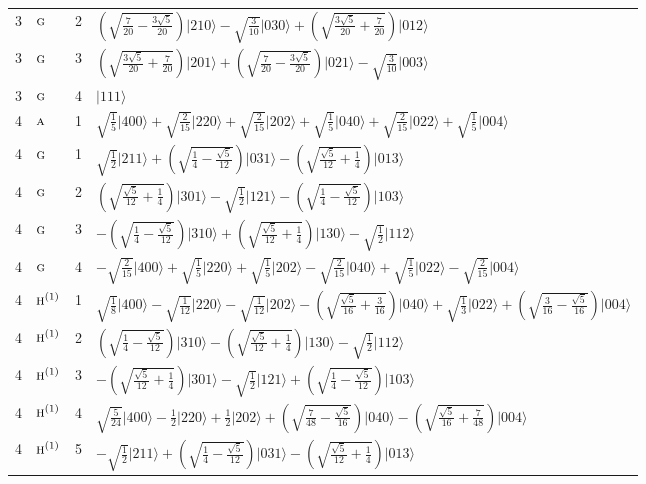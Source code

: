 \documentclass[11pt]{article}
\newcommand{\irr}[1]{\text{\normalfont\scshape #1}}
\newcommand{\occ}[1]{\lvert #1\rangle}
\begin{document}
\begin{longtable}{c l c p{}}
3 & $\irr{g}$ & 2 & $(\sqrt{\frac{7}{20} - \frac{3 \sqrt{5}}{20}})\occ{210}-\sqrt{\tfrac{3}{10}}\occ{030}+(\sqrt{\frac{3 \sqrt{5}}{20} + \frac{7}{20}})\occ{012}$\\
3 & $\irr{g}$ & 3 & $(\sqrt{\frac{3 \sqrt{5}}{20} + \frac{7}{20}})\occ{201}+(\sqrt{\frac{7}{20} - \frac{3 \sqrt{5}}{20}})\occ{021}-\sqrt{\tfrac{3}{10}}\occ{003}$\\
3 & $\irr{g}$ & 4 & $\occ{111}$\\
\hline
4 & $\irr{a}$ & 1 & $\sqrt{\tfrac{1}{5}}\occ{400}+\sqrt{\tfrac{2}{15}}\occ{220}+\sqrt{\tfrac{2}{15}}\occ{202}+\sqrt{\tfrac{1}{5}}\occ{040}+\sqrt{\tfrac{2}{15}}\occ{022}+\sqrt{\tfrac{1}{5}}\occ{004}$\\
4 & $\irr{g}$ & 1 & $\sqrt{\tfrac{1}{2}}\occ{211}+(\sqrt{\frac{1}{4} - \frac{\sqrt{5}}{12}})\occ{031}-(\sqrt{\frac{\sqrt{5}}{12} + \frac{1}{4}})\occ{013}$\\
4 & $\irr{g}$ & 2 & $(\sqrt{\frac{\sqrt{5}}{12} + \frac{1}{4}})\occ{301}-\sqrt{\tfrac{1}{2}}\occ{121}-(\sqrt{\frac{1}{4} - \frac{\sqrt{5}}{12}})\occ{103}$\\
4 & $\irr{g}$ & 3 & $-(\sqrt{\frac{1}{4} - \frac{\sqrt{5}}{12}})\occ{310}+(\sqrt{\frac{\sqrt{5}}{12} + \frac{1}{4}})\occ{130}-\sqrt{\tfrac{1}{2}}\occ{112}$\\
4 & $\irr{g}$ & 4 & $-\sqrt{\tfrac{2}{15}}\occ{400}+\sqrt{\tfrac{1}{5}}\occ{220}+\sqrt{\tfrac{1}{5}}\occ{202}-\sqrt{\tfrac{2}{15}}\occ{040}+\sqrt{\tfrac{1}{5}}\occ{022}-\sqrt{\tfrac{2}{15}}\occ{004}$\\
4 & $\irr{h}^{(1)}$ & 1 & $\sqrt{\tfrac{1}{8}}\occ{400}-\sqrt{\tfrac{1}{12}}\occ{220}-\sqrt{\tfrac{1}{12}}\occ{202}-(\sqrt{\frac{\sqrt{5}}{16} + \frac{3}{16}})\occ{040}+\sqrt{\tfrac{1}{3}}\occ{022}+(\sqrt{\frac{3}{16} - \frac{\sqrt{5}}{16}})\occ{004}$\\
4 & $\irr{h}^{(1)}$ & 2 & $(\sqrt{\frac{1}{4} - \frac{\sqrt{5}}{12}})\occ{310}-(\sqrt{\frac{\sqrt{5}}{12} + \frac{1}{4}})\occ{130}-\sqrt{\tfrac{1}{2}}\occ{112}$\\
4 & $\irr{h}^{(1)}$ & 3 & $-(\sqrt{\frac{\sqrt{5}}{12} + \frac{1}{4}})\occ{301}-\sqrt{\tfrac{1}{2}}\occ{121}+(\sqrt{\frac{1}{4} - \frac{\sqrt{5}}{12}})\occ{103}$\\
4 & $\irr{h}^{(1)}$ & 4 & $\sqrt{\tfrac{5}{24}}\occ{400}-\tfrac{1}{2}\occ{220}+\tfrac{1}{2}\occ{202}+(\sqrt{\frac{7}{48} - \frac{\sqrt{5}}{16}})\occ{040}-(\sqrt{\frac{\sqrt{5}}{16} + \frac{7}{48}})\occ{004}$\\
4 & $\irr{h}^{(1)}$ & 5 & $-\sqrt{\tfrac{1}{2}}\occ{211}+(\sqrt{\frac{1}{4} - \frac{\sqrt{5}}{12}})\occ{031}-(\sqrt{\frac{\sqrt{5}}{12} + \frac{1}{4}})\occ{013}$\\

\end{longtable}
\end{document}
